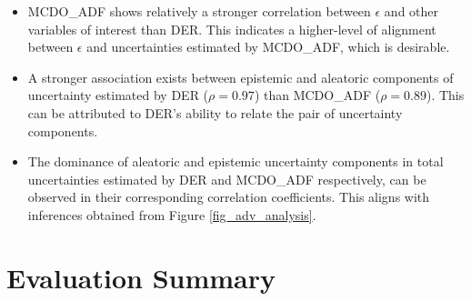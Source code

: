\begin{itemize}
	\item MCDO\_ADF shows relatively a stronger correlation between $\epsilon$ and other variables of interest than DER. This indicates a higher-level of alignment between $\epsilon$ and uncertainties estimated by MCDO\_ADF, which is desirable.
	\item A stronger association exists between epistemic and aleatoric components of uncertainty estimated by DER ($\rho = 0.97$) than MCDO\_ADF ($\rho = 0.89$). This can be attributed to DER's ability to relate the pair of uncertainty components.
	\item The dominance of aleatoric and epistemic uncertainty components in total uncertainties estimated by DER and MCDO\_ADF respectively, can be observed in their corresponding correlation coefficients. This aligns with inferences obtained from Figure \ref{fig_adv_analysis}. 
\end{itemize}

\section{Evaluation Summary}

